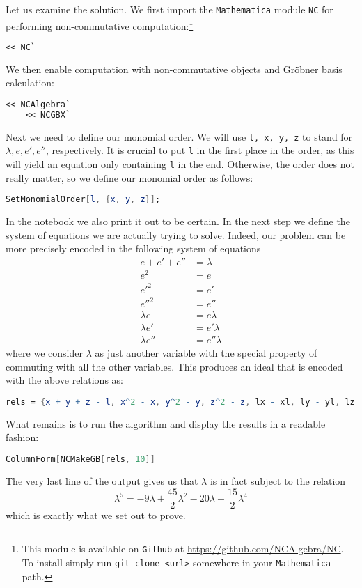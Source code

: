 \documentclass[a4paper, 12pt]{article}
\begin{document}
\begin{Exercise}
    Let us examine the solution.
    We first import the \texttt{Mathematica} module \texttt{NC} for performing non-commutative computation:\footnote{This module is available on \texttt{Github} at \url{https://github.com/NCAlgebra/NC}. To install simply run \texttt{git clone <url>} somewhere in your \texttt{Mathematica} path.}
    \begin{lstlisting}[language=Mathematica]
    << NC`
    \end{lstlisting}
    We then enable computation with non-commutative objects and Gr\"obner basis calculation:
    \begin{lstlisting}[language=Mathematica]
    << NCAlgebra`
    << NCGBX`
    \end{lstlisting}
    Next we need to define our monomial order.
    We will use \texttt{l, x, y, z} to stand for $\lambda, e, e', e''$, respectively.
    It is crucial to put \texttt{l} in the first place in the order, as this will yield an equation only containing \texttt{l} in the end.
    Otherwise, the order does not really matter, so we define our monomial order as follows:
    \begin{lstlisting}[language=Mathematica]
    SetMonomialOrder[l, {x, y, z}];
    \end{lstlisting}
    In the notebook we also print it out to be certain.
    In the next step we define the system of equations we are actually trying to solve.
    Indeed, our problem can be more precisely encoded in the following system of equations
    \begin{align*}
        e + e' + e'' &= \lambda \\
        e^2 &= e  \\
        e'^2 &= e'  \\
        e''^2 &= e''  \\
        \lambda e &= e \lambda \\
        \lambda e' &= e' \lambda \\
        \lambda e'' &= e'' \lambda
    \end{align*}
    where we consider $\lambda$ as just another variable with the special property of commuting with all the other variables.
    This produces an ideal that is encoded with the above relations as:
\begin{lstlisting}[language=Mathematica]
rels = {x + y + z - l, x^2 - x, y^2 - y, z^2 - z, lx - xl, ly - yl, lz - zl}
\end{lstlisting}
    What remains is to run the algorithm and display the results in a readable fashion:
    \begin{lstlisting}[language=Mathematica]
    ColumnForm[NCMakeGB[rels, 10]]
    \end{lstlisting}
    The very last line of the output gives us that $\lambda$ is in fact subject to the relation
    \[
        \lambda^5 = -9\lambda + \frac{45}{2}\lambda^2 - 20 \lambda + \frac{15}{2}\lambda^4
    \]
    which is exactly what we set out to prove.


\end{Exercise}
\end{document}
